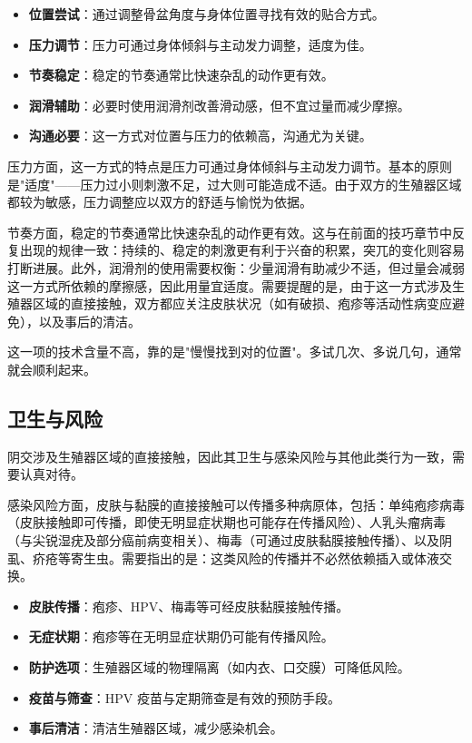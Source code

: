 \documentclass[12pt,UTF8]{ctexbook}
\newcommand{\keyword}[1]{\textbf{#1}}
\begin{document}
\begin{itemize}
	\item \keyword{位置尝试}：通过调整骨盆角度与身体位置寻找有效的贴合方式。
	\item \keyword{压力调节}：压力可通过身体倾斜与主动发力调整，适度为佳。
	\item \keyword{节奏稳定}：稳定的节奏通常比快速杂乱的动作更有效。
	\item \keyword{润滑辅助}：必要时使用润滑剂改善滑动感，但不宜过量而减少摩擦。
	\item \keyword{沟通必要}：这一方式对位置与压力的依赖高，沟通尤为关键。
\end{itemize}

压力方面，这一方式的特点是压力可通过身体倾斜与主动发力调节。基本的原则是"适度"——压力过小则刺激不足，过大则可能造成不适。由于双方的生殖器区域都较为敏感，压力调整应以双方的舒适与愉悦为依据。

节奏方面，稳定的节奏通常比快速杂乱的动作更有效。这与在前面的技巧章节中反复出现的规律一致：持续的、稳定的刺激更有利于兴奋的积累，突兀的变化则容易打断进展。此外，润滑剂的使用需要权衡：少量润滑有助减少不适，但过量会减弱这一方式所依赖的摩擦感，因此用量宜适度。需要提醒的是，由于这一方式涉及生殖器区域的直接接触，双方都应关注皮肤状况（如有破损、疱疹等活动性病变应避免），以及事后的清洁。

\begin{tcolorbox}[colback=pink!5!white,colframe=red!50!black,title=贴心小叮咛]
	这一项的技术含量不高，靠的是"慢慢找到对的位置"。多试几次、多说几句，通常就会顺利起来。
\end{tcolorbox}
\subsection{卫生与风险}

阴交涉及生殖器区域的直接接触，因此其卫生与感染风险与其他此类行为一致，需要认真对待。

感染风险方面，皮肤与黏膜的直接接触可以传播多种病原体，包括：单纯疱疹病毒（皮肤接触即可传播，即使无明显症状期也可能存在传播风险）、人乳头瘤病毒（与尖锐湿疣及部分癌前病变相关）、梅毒（可通过皮肤黏膜接触传播）、以及阴虱、疥疮等寄生虫。需要指出的是：这类风险的传播并不必然依赖插入或体液交换。

\begin{itemize}
	\item \keyword{皮肤传播}：疱疹、HPV、梅毒等可经皮肤黏膜接触传播。
	\item \keyword{无症状期}：疱疹等在无明显症状期仍可能有传播风险。
	\item \keyword{防护选项}：生殖器区域的物理隔离（如内衣、口交膜）可降低风险。
	\item \keyword{疫苗与筛查}：HPV 疫苗与定期筛查是有效的预防手段。
	\item \keyword{事后清洁}：清洁生殖器区域，减少感染机会。
\end{itemize}
\end{document}
